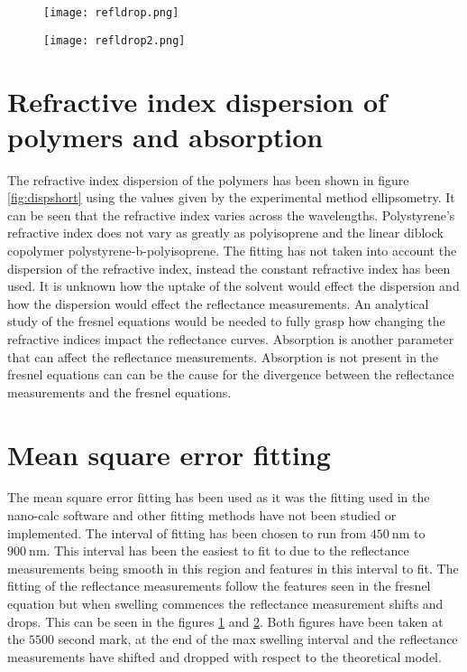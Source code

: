 \documentclass[MasterThesisMain.tex]{subfiles}
\begin{document}
\begin{figure}[H]
\centering
\texttt{[image: refldrop.png]}
\caption{}
\label{fig:drop}
\end{figure}

\begin{figure}[H]
\centering
\texttt{[image: refldrop2.png]}
\caption{}
\label{fig:drop2}
\end{figure}

\section{Refractive index dispersion of polymers and absorption}
The refractive index dispersion of the polymers has been shown in figure \ref{fig:dispshort} using the values given by the experimental method ellipsometry. It can be seen that the refractive index varies across the wavelengths. Polystyrene's refractive index does not vary as greatly as polyisoprene and the linear diblock copolymer polystyrene-b-polyisoprene. The fitting has not taken into account the dispersion of the refractive index, instead the constant refractive index has been used. It is unknown how the uptake of the solvent would effect the dispersion and how the dispersion would effect the reflectance measurements. An analytical study of the fresnel equations would be needed to fully grasp how changing the refractive indices impact the reflectance curves. Absorption is another parameter that can affect the reflectance measurements. Absorption is not present in the fresnel equations can can be the cause for the divergence between the reflectance measurements and the fresnel equations.    


\section{Mean square error fitting}
The mean square error fitting has been used as it was the fitting used in the nano-calc software and other fitting methods have not been studied or implemented. The interval of fitting has been chosen to run from $\SI{450}{\nano\meter}$ to $\SI{900}{\nano\meter}$. This interval has been the easiest to fit to due to the reflectance measurements being smooth in this region and features in this interval to fit. The fitting of the reflectance measurements follow the features seen in the fresnel equation but when swelling commences the reflectance measurement shifts and drops. This can be seen in the figures \ref{fig:drop} and \ref{fig:drop2}. Both figures have been taken at the $5500$ second mark, at the end of the max swelling interval and the reflectance measurements have shifted and dropped with respect to the theoretical model.
\end{document}
